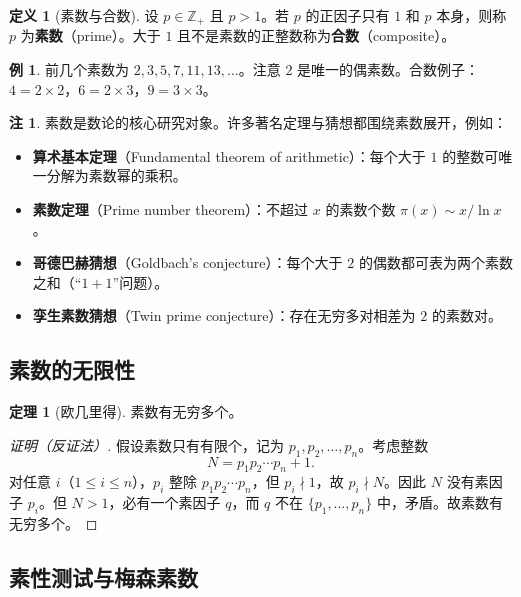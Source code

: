 \documentclass[UTF8,11pt,a4paper]{ctexbook}   %
\theoremstyle{definition}
\newtheorem{definition}{定义}[section]
\newtheorem{theorem}{定理}[section]
\newtheorem{example}{例}[section]
\newtheorem{remark}{注}[section]
\begin{document}
\begin{definition}[素数与合数]
设 $p\in\mathbb{Z}_+$ 且 $p>1$。若 $p$ 的正因子只有 $1$ 和 $p$ 本身，则称 $p$ 为\textbf{素数}（prime）。大于 $1$ 且不是素数的正整数称为\textbf{合数}（composite）。
\end{definition}

\begin{example}
前几个素数为 $2,3,5,7,11,13,\dots$。注意 $2$ 是唯一的偶素数。合数例子：$4=2\times 2$，$6=2\times 3$，$9=3\times 3$。
\end{example}

\begin{remark}
素数是数论的核心研究对象。许多著名定理与猜想都围绕素数展开，例如：
\begin{itemize}
    \item \textbf{算术基本定理}（Fundamental theorem of arithmetic）：每个大于 $1$ 的整数可唯一分解为素数幂的乘积。
    \item \textbf{素数定理}（Prime number theorem）：不超过 $x$ 的素数个数 $\pi(x)\sim x/\ln x$。
    \item \textbf{哥德巴赫猜想}（Goldbach's conjecture）：每个大于 $2$ 的偶数都可表为两个素数之和（``$1+1$''问题）。
    \item \textbf{孪生素数猜想}（Twin prime conjecture）：存在无穷多对相差为 $2$ 的素数对。
\end{itemize}
\end{remark}

\subsection{素数的无限性}

\begin{theorem}[欧几里得]
素数有无穷多个。
\end{theorem}

\begin{proof}[证明（反证法）]
假设素数只有有限个，记为 $p_1,p_2,\dots,p_n$。考虑整数
\[
N=p_1p_2\cdots p_n+1.
\]
对任意 $i$（$1\le i\le n$），$p_i$ 整除 $p_1p_2\cdots p_n$，但 $p_i\nmid 1$，故 $p_i\nmid N$。因此 $N$ 没有素因子 $p_i$。但 $N>1$，必有一个素因子 $q$，而 $q$ 不在 $\{p_1,\dots,p_n\}$ 中，矛盾。故素数有无穷多个。
\end{proof}

\subsection{素性测试与梅森素数}
\end{document}
